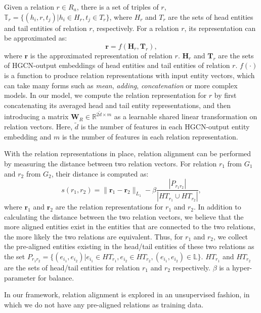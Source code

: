 \documentclass[11pt,a4paper]{article}
\begin{document}
Given a relation $r \in R_a$, there is a set of triples of $r$, $\mathbb{T}_r = \{(h_i, r, t_j) | h_i \in H_r, t_j \in T_r\}$, where $H_r$ and $T_r$ are the sets of head entities and tail entities of relation $r$, respectively. For a relation $r$, its representation can be approximated as:
\begin{equation}
\label{relEmbeddings}
\bm{r} = f(\textbf{H}_r, \textbf{T}_r),
\end{equation}
where $\bm{r}$ is the approximated representation of relation $r$. $\textbf{H}_r$ and $\textbf{T}_r$ are the sets of HGCN-output embeddings of head
entities and tail entities of relation $r$. $f(\cdot)$ is a function to produce relation representations with input entity vectors, which can
take many forms such as \emph{mean}, \emph{adding}, \emph{concatenation} or more complex models. In our model, we compute
the relation representation for $r$ by first concatenating its averaged head and tail entity representations, and then introducing a matrix
$\textbf{W}_R \in \mathbb{R}^{2\tilde{d} \times m}$ as a learnable shared linear transformation on relation vectors. Here, $\tilde{d}$ is the number
of features in each HGCN-output entity embedding and $m$ is the number of features in each relation representation.

With the relation representations in place, relation alignment can be performed by measuring the distance between two relation vectors. For relation $r_1$ from $G_1$ and $r_2$ from $G_2$, their distance is computed as:
\begin{equation}
\label{rel_distance}
s(r_1, r_2) = \|\bm{r}_1-\bm{r}_2\|_{L_1}-\beta\frac{|P_{r_1r_2}|}{|HT_{r_1} \cup HT_{r_2}|},
\end{equation}
where $\bm{r}_1$ and $\bm{r}_2$ are the relation representations for $r_1$ and $r_2$. In addition to calculating the distance between the two relation vectors, we believe that the more aligned entities exist in the entities that are connected to the two relations, the more likely the two relations are equivalent. Thus, for $r_1$ and $r_2$, we collect the pre-aligned entities existing in the head/tail entities of these two relations as the set $P_{r_1r_2} = \{(e_{i_1}, e_{i_2}) | e_{i_1} \in HT_{r_1}, e_{i_2} \in HT_{r_2}, (e_{i_1}, e_{i_2}) \in \mathbb{L}\}$. $HT_{r_1}$ and $HT_{r_2}$ are the sets of head/tail entities for relation $r_1$ and $r_2$ respectively. $\beta$ is a hyper-parameter for balance.

In our framework, relation alignment is explored in an unsupervised fashion, in which we do not have any pre-aligned relations as training data.
\end{document}
